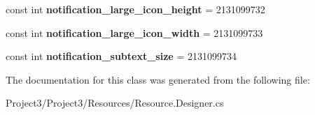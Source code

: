 \begin{DoxyCompactItemize}
\item 
\mbox{\label{classXaria_1_1Resource_1_1Dimension_af6f58f2d113cfac73c8020eb7b6eceea}} 
const int {\bfseries notification\+\_\+large\+\_\+icon\+\_\+height} = 2131099732
\item 
\mbox{\label{classXaria_1_1Resource_1_1Dimension_ab41dbd22bf3934fe3ad12bbda394b4c4}} 
const int {\bfseries notification\+\_\+large\+\_\+icon\+\_\+width} = 2131099733
\item 
\mbox{\label{classXaria_1_1Resource_1_1Dimension_a0442d9cfe03cc08e5c0e263c90fc26b5}} 
const int {\bfseries notification\+\_\+subtext\+\_\+size} = 2131099734
\end{DoxyCompactItemize}


The documentation for this class was generated from the following file\+:\begin{DoxyCompactItemize}
\item 
Project3/\+Project3/\+Resources/Resource.\+Designer.\+cs\end{DoxyCompactItemize}

